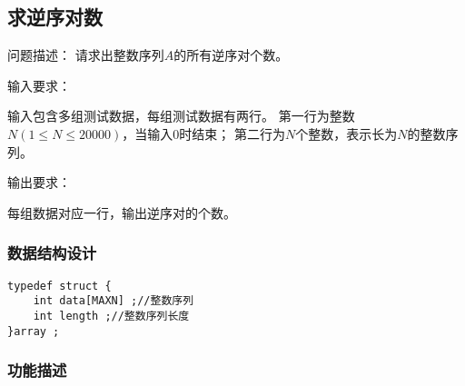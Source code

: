 \subsection{求逆序对数}
\begin{formal}
    {\cuhei 问题描述：}
请求出整数序列$A$的所有逆序对个数。
\end{formal}
\begin{formal}
    {\cuhei 输入要求：}

    输入包含多组测试数据，每组测试数据有两行。
第一行为整数$N(1 \leq N \leq 20000)$，当输入0时结束；
第二行为$N$个整数，表示长为$N$的整数序列。
\end{formal}
\begin{formal}
    {\cuhei 输出要求：}

    每组数据对应一行，输出逆序对的个数。
\end{formal}
\subsubsection{数据结构设计}
\begin{lstlisting}[name=Q1]
typedef struct {
    int data[MAXN] ;//整数序列
    int length ;//整数序列长度
}array ;
\end{lstlisting}
\subsubsection{功能描述}


